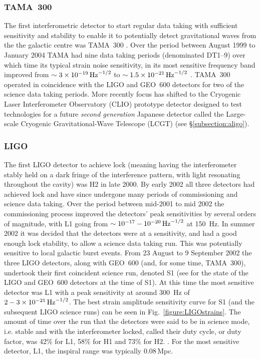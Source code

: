 \documentclass{article}
\begin{document}
\subsubsection{TAMA~300}
The first interferometric detector to start regular data taking with sufficient
sensitivity and stability to enable it to potentially detect gravitational waves
from the the galactic centre was TAMA~300 \cite{Ando:2001}. Over the period
between August 1999 to January 2004 TAMA had nine data taking periods
(denominated DT1--9) over which time its typical strain noise sensitivity, in
its most sensitive frequency band improved from $\sim3\times10^{-19}\,{\rm
Hz}^{-1/2}$ to $\sim1.5\times10^{-21}\,{\rm Hz}^{-1/2}$ \cite{Akutsu:2006}. 
TAMA~300 operated in coincidence with the LIGO and GEO~600 detectors for two of
the science data taking periods. More recently focus has shifted to the
Cryogenic Laser Interferometer Observatory (CLIO) prototype detector
\cite{Yamamoto:2008, CLIOweb} designed to test technologies for a future {\it
second generation} Japanese detector called the Large-scale Cryogenic
Gravitational-Wave Telescope (LCGT) (see \S\ref{subsection:aligo}).

\subsubsection{LIGO}\label{sec:ligoruns}
The first LIGO detector to achieve lock (meaning having the interferometer
stably held on a dark fringe of the interference pattern, with light resonating
throughout the cavity) was H2 in late 2000. By early 2002 all three detectors
had achieved lock and have since undergone many periods of commissioning and
science data taking. Over the period between mid-2001 to mid 2002 the
commissioning process improved the detectors' peak sensitivities by several
orders of magnitude, with L1 going from $\sim10^{-17}-10^{-20}\,{\rm Hz}^{-1/2}$
at 150~Hz. In summer 2002 it was decided that the detectors were at a
sensitivity, and had a good enough lock stability, to allow a science data
taking run. This was potentially sensitive to local galactic burst events. From
23 August to 9 September 2002 the three LIGO detectors, along with GEO~600 (and,
for some time, TAMA~300), undertook their first coincident science run, denoted
S1 (see \cite{Abbott:2004a} for the state of the LIGO and GEO~600 detectors at
the time of S1). At this time the most sensitive detector was L1 with a peak
sensitivity at around 300~Hz of $2-3\times10^{-21}\,{\rm Hz}^{-1/2}$. The best
strain amplitude sensitivity curve for S1 (and the subsequent LIGO science runs)
can be seen in Fig.~\ref{figure:LIGOstrains}. The amount of time over the run
that the detectors were said to be in science mode, i.e. stable and with the
interferometer locked, called their duty cycle, or duty factor, was 42\% for L1,
58\% for H1 and 73\% for H2. . For the most sensitive detector, L1, the inspiral
range was typically 0.08\,Mpc.
\end{document}
